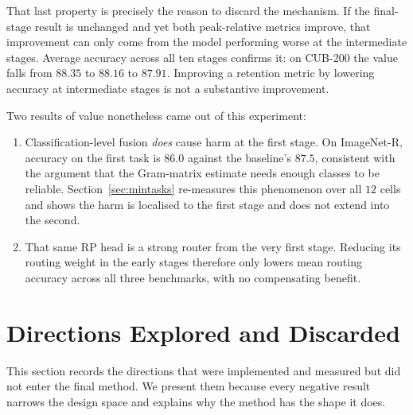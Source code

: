 \documentclass[11pt,a4paper]{article}
\begin{document}
That last property is precisely the reason to discard the mechanism. If the
final-stage result is unchanged and yet both peak-relative metrics improve, that
improvement can only come from the model performing worse at the intermediate
stages. Average accuracy across all ten stages confirms it: on CUB-200 the value
falls from $88.35$ to $88.16$ to $87.91$. Improving a retention metric by
lowering accuracy at intermediate stages is not a substantive improvement.

Two results of value nonetheless came out of this experiment:

\begin{enumerate}[leftmargin=*, itemsep=3pt]
\item Classification-level fusion \emph{does} cause harm at the first stage. On
      ImageNet-R, accuracy on the first task is $86.0$ against the baseline's
      $87.5$, consistent with the argument that the Gram-matrix estimate needs
      enough classes to be reliable. Section~\ref{sec:mintasks} re-measures this
      phenomenon over all $12$ cells and shows the harm is localised to the
      first stage and does not extend into the second.
\item That same RP head is a strong router from the very first stage. Reducing
      its routing weight in the early stages therefore only lowers mean routing
      accuracy across all three benchmarks, with no compensating benefit.
\end{enumerate}

\section{Directions Explored and Discarded}
\label{sec:closed}

This section records the directions that were implemented and measured but did
not enter the final method. We present them because every negative result
narrows the design space and explains why the method has the shape it does.
\end{document}
